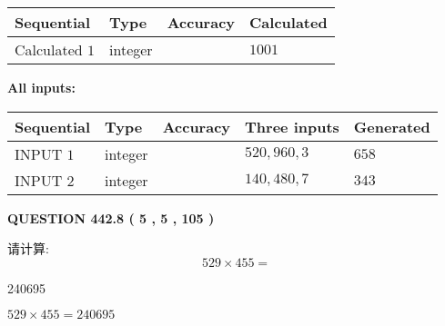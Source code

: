 \documentclass{ctexart}
\begin{document}
   
  
  
\noindent\begin{tabular}{|l|l|l|l|}
\hline
 Sequential & Type & Accuracy & Calculated \\ 
\hline
 
 
  Calculated $  1 $ & integer &  & 
  $ 1001 $ 
 \\  \hline  
 \end{tabular}
   
   
   
   
\noindent\vspace{0.1in}\hspace{-0.08in} {\textbf{\Large{All inputs: }}}
   
   
  
  
\noindent\begin{tabular}{|l|l|l|l|l|}
\hline
 Sequential & Type & Accuracy & Three inputs & Generated \\ 
\hline
 
 
  INPUT $  1 $ & integer &  & $
 520
 , 
 960
 , 
 3
 $ & $ 658 $ 
 \\  \hline  
 
 
  INPUT $  2 $ & integer &  & $
 140
 , 
 480
 , 
 7
 $ & $ 343 $ 
 \\  \hline  
 \end{tabular}
   
   
  
\vspace{0.2in}
  
{\textbf{\Large{QUESTION
442.8 
 ( 5 , 5 , 105 )
}}}
  
  
 
请计算:
\begin{equation}
529  \times    %
455 = \nonumber
\end{equation}
 
 
 
\noindent{}
 
 

240695
 
 
\noindent{}
 
 

 
 
 
\noindent{}
 
 

$ %
529 \times  %
455=   %
240695$
 
\end{document}
